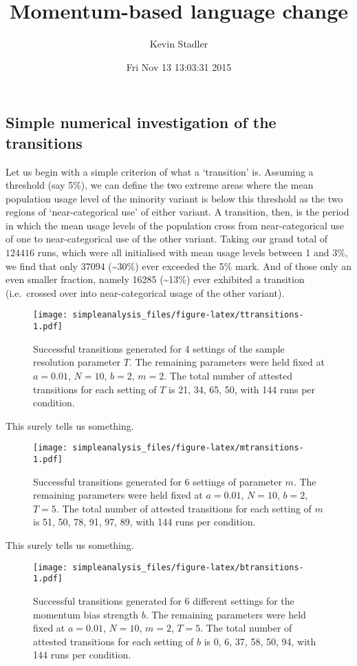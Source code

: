 \documentclass[a4paper]{article}
\title{Momentum-based language change}
\author{Kevin Stadler}
\date{Fri Nov 13 13:03:31 2015}
\begin{document}
\maketitle

\subsection{Simple numerical investigation of the
transitions}\label{simple-numerical-investigation-of-the-transitions}

Let us begin with a simple criterion of what a `transition' is. Assuming
a threshold (say 5\%), we can define the two extreme areas where the
mean population usage level of the minority variant is below this
threshold as the two regions of `near-categorical use' of either
variant. A transition, then, is the period in which the mean usage
levels of the population cross from near-categorical use of one to
near-categorical use of the other variant. Taking our grand total of
\(124416\) runs, which were all initialised with mean usage levels
between 1 and 3\%, we find that only 37094 (\textasciitilde{}30\%) ever
exceeded the 5\% mark. And of those only an even smaller fraction,
namely 16285 (\textasciitilde{}13\%) ever exhibited a transition
(i.e.~crossed over into near-categorical usage of the other variant).

\begin{figure}[htbp]
\centering
\texttt{[image: simpleanalysis\_files/figure-latex/ttransitions-1.pdf]}
\caption{Successful transitions generated for 4 settings of the sample
resolution parameter \(T\). The remaining parameters were held fixed at
\(a=0.01\), \(N=10\), \(b=2\), \(m=2\). The total number of attested
transitions for each setting of \(T\) is 21, 34, 65, 50, with 144 runs
per condition.}
\end{figure}

This surely tells us something.

\begin{figure}[htbp]
\centering
\texttt{[image: simpleanalysis\_files/figure-latex/mtransitions-1.pdf]}
\caption{Successful transitions generated for 6 settings of parameter
\(m\). The remaining parameters were held fixed at \(a=0.01\), \(N=10\),
\(b=2\), \(T=5\). The total number of attested transitions for each
setting of \(m\) is 51, 50, 78, 91, 97, 89, with 144 runs per
condition.}
\end{figure}

This surely tells us something.

\begin{figure}[htbp]
\centering
\texttt{[image: simpleanalysis\_files/figure-latex/btransitions-1.pdf]}
\caption{Successful transitions generated for 6 different settings for
the momentum bias strength \(b\). The remaining parameters were held
fixed at \(a=0.01\), \(N=10\), \(m=2\), \(T=5\). The total number of
attested transitions for each setting of \(b\) is 0, 6, 37, 58, 50, 94,
with 144 runs per condition.}
\end{figure}
\end{document}
